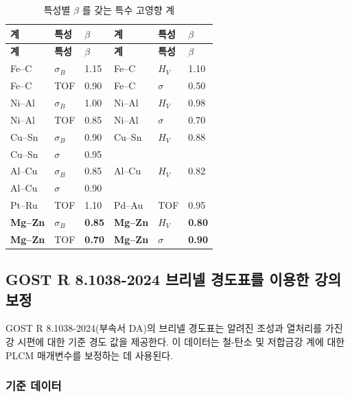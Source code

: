 \documentclass[12pt,a4paper]{article}
\begin{document}
	\begin{longtable}{p{2.2cm} p{2.2cm} p{1.2cm} p{2.2cm} p{2.2cm} p{1.2cm}}
		\caption{특성별 $\beta$ 를 갖는 특수 고영향 계}\label{tab:beta_special}\\
		\toprule
		\textbf{계} & \textbf{특성} & $\beta$ & \textbf{계} & \textbf{특성} & $\beta$ \\
		\midrule
		\endfirsthead
		\toprule
		\textbf{계} & \textbf{특성} & $\beta$ & \textbf{계} & \textbf{특성} & $\beta$ \\
		\midrule
		\endhead
		Fe–C  & $\sigma_B$ & 1.15 & Fe–C  & $H_V$ & 1.10 \\
		Fe–C  & TOF & 0.90 & Fe–C  & $\sigma$ & 0.50 \\
		Ni–Al & $\sigma_B$ & 1.00 & Ni–Al & $H_V$ & 0.98 \\
		Ni–Al & TOF & 0.85 & Ni–Al & $\sigma$ & 0.70 \\
		Cu–Sn & $\sigma_B$ & 0.90 & Cu–Sn & $H_V$ & 0.88 \\
		Cu–Sn & $\sigma$ & 0.95 & & & \\
		Al–Cu & $\sigma_B$ & 0.85 & Al–Cu & $H_V$ & 0.82 \\
		Al–Cu & $\sigma$ & 0.90 & & & \\
		Pt–Ru & TOF & 1.10 & Pd–Au & TOF & 0.95 \\
		\rowcolor{gray!10}
		\textbf{Mg–Zn} & $\sigma_B$ & \textbf{0.85} & \textbf{Mg–Zn} & $H_V$ & \textbf{0.80} \\
		\textbf{Mg–Zn} & TOF & \textbf{0.70} & \textbf{Mg–Zn} & $\sigma$ & \textbf{0.90} \\
		\bottomrule
	\end{longtable}
	
	
	\subsection{GOST R 8.1038-2024 브리넬 경도표를 이용한 강의 보정}
	\label{subsec:steel_calibration}
	
	GOST R 8.1038-2024(부속서 DA)의 브리넬 경도표는 알려진 조성과 열처리를 가진 강 시편에 대한 기준 경도 값을 제공한다. 이 데이터는 철-탄소 및 저합금강 계에 대한 PLCM 매개변수를 보정하는 데 사용된다.
	
	\subsubsection{기준 데이터}
	
\end{document}
